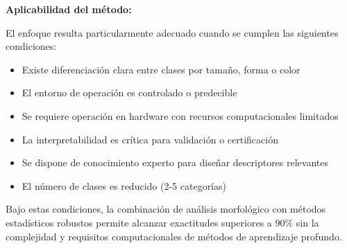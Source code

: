 \textbf{Aplicabilidad del método:}

El enfoque resulta particularmente adecuado cuando se cumplen las siguientes condiciones:
\begin{itemize}
\item Existe diferenciación clara entre clases por tamaño, forma o color
\item El entorno de operación es controlado o predecible
\item Se requiere operación en hardware con recursos computacionales limitados
\item La interpretabilidad es crítica para validación o certificación
\item Se dispone de conocimiento experto para diseñar descriptores relevantes
\item El número de clases es reducido (2-5 categorías)
\end{itemize}

Bajo estas condiciones, la combinación de análisis morfológico con métodos estadísticos robustos permite alcanzar exactitudes superiores a 90\% sin la complejidad y requisitos computacionales de métodos de aprendizaje profundo.
